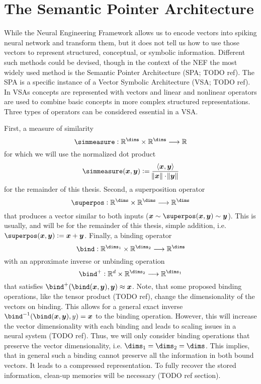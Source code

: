 \chapter{The Semantic Pointer Architecture}
While the Neural Engineering Framework allows us to encode vectors into spiking neural network and transform them, but it does not tell us how to use those vectors to represent structured, conceptual, or symbolic information.
Different such methods could be devised, though in the context of the NEF the most widely used method is the Semantic Pointer Architecture (SPA\@; TODO ref).
The SPA is a specific instance of a Vector Symbolic Architecture (VSA\@; TODO ref).
In VSAs concepts are represented with vectors and linear and nonlinear operators are used to combine basic concepts in more complex structured representations.
Three types of operators can be considered essential in a VSA\@.

First, a measure of similarity
\begin{equation}
    \simmeasure: \mathbb{R}^{\dims} \times \mathbb{R}^{\dims} \longrightarrow \mathbb{R}
\end{equation}
for which we will use the normalized dot product
\begin{equation}
    \simmeasure(\vc x, \vc y) := \frac{\left\langle \vc x, \vc y \right\rangle}{\norm{\vc x} \cdot \norm{\vc y}}
\end{equation}
for the remainder of this thesis.
Second, a superposition operator
\begin{equation}
    \superpos: \mathbb{R}^{\dims} \times \mathbb{R}^{\dims} \longrightarrow \mathbb{R}^{\dims}
\end{equation}
that produces a vector similar to both inputs ($\vc x \sim \superpos(\vc x, \vc y) \sim \vc y$).
This is usually, and will be for the remainder of this thesis, simple addition, i.e. $\superpos(\vc x, \vc y) := \vc x + \vc y$.
Finally, a binding operator
\begin{equation}
    \bind: \mathbb{R}^{\dims_1} \times \mathbb{R}^{\dims_2} \longrightarrow \mathbb{R}^{\dims}
\end{equation}
with an approximate inverse or unbinding operation
\begin{equation}
    \bind^+: \mathbb{R}^d \times \mathbb{R}^{\dims_2} \longrightarrow \mathbb{R}^{\dims_1}
\end{equation}
that satisfies $\bind^+(\bind(\vc x, \vc y), \vc y) \approx \vc x$.
Note, that some proposed binding operations, like the tensor product (TODO ref), change the dimensionality of the vectors on binding.
This allows for a general exact inverse $\bind^{-1}(\bind(\vc x, \vc y), y) = \vc x$ to the binding operation.
However, this will increase the vector dimensionality with each binding and leads to scaling issues in a neural system (TODO ref).
Thus, we will only consider binding operations that preserve the vector dimensionality, i.e. $\dims_1 = \dims_2 = \dims$.
This implies, that in general such a binding cannot preserve all the information in both bound vectors.
It leads to a compressed representation.
To fully recover the stored information, clean-up memories will be necessary (TODO ref section).

